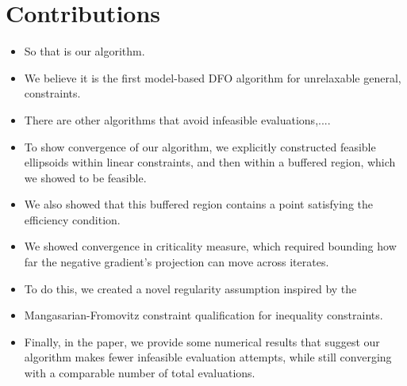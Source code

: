 \documentclass{article}
\begin{document}
	\section{Contributions}
\begin{itemize}
\item So that is our algorithm.
\item We believe it is the first model-based DFO algorithm for unrelaxable general, constraints.
\item There are other algorithms that avoid infeasible evaluations,....
\item To show convergence of our algorithm, we explicitly constructed feasible ellipsoids within linear constraints, and then within a buffered region, which we showed to be feasible.
\item We also showed that this buffered region contains a point satisfying the efficiency condition.
\item We showed convergence in criticality measure, which required bounding how far the negative gradient's projection can move across iterates.
\item To do this, we created a novel regularity assumption inspired by the 
\item Mangasarian-Fromovitz constraint qualification for inequality constraints.
\item Finally, in the paper, we provide some numerical results that suggest  our algorithm makes fewer infeasible evaluation attempts, while still converging with a comparable number of total evaluations.
\end{itemize}
\end{document}
